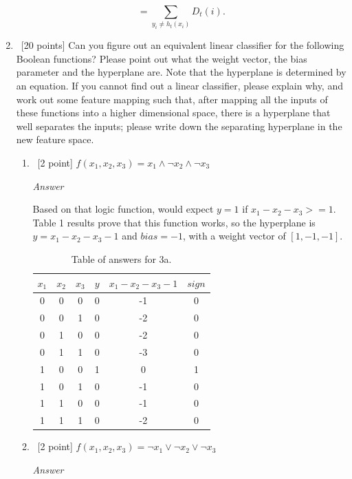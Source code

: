 \documentclass[12pt, fullpage,letterpaper]{article}
\begin{document}
\begin{enumerate}
\[
    = \sum_{y_i \neq h_t(x_i)} D_t(i).
\]

\item~[20 points] Can you figure out an equivalent linear classifier for the following Boolean functions? Please point out what the weight vector, the bias parameter and the hyperplane are. Note that the hyperplane is determined by an equation. If you cannot find out a  linear classifier, please explain why, and work out some feature mapping such that, after mapping all the inputs of these functions into a higher dimensional space, there is a hyperplane that well separates the inputs; please write down the separating hyperplane in the new feature space. 
	\begin{enumerate}
		\item~[2 point] $f(x_1, x_2, x_3) = x_1 \land \neg x_2 \land \neg x_3$
		
		\emph{Answer}
		
		Based on that logic function, would expect $y=1$ if $x_1-x_2-x_3>=1$. Table 1 results prove that this function works, so the hyperplane is $y=x_1-x_2-x_3-1$ and $bias=-1$, with a weight vector of $[1, -1, -1]$.
		
		\begin{table}
        	\centering
        	\begin{tabular}{ccccc|c}
        		$x_1 $ & $x_2$ & $x_3$ & $y$ & $x_1-x_2-x_3-1$ & $sign$\\ 
        		\hline\hline
        		0 & 0 & 0 & 0 & -1 & 0 \\ \hline
        		0 & 0 & 1 & 0 & -2 & 0 \\ \hline
        		0 & 1 & 0 & 0 & -2 & 0 \\ \hline
        		0 & 1 & 1 & 0 & -3 & 0 \\ \hline
        		1 & 0 & 0 & 1 &  0 & 1 \\ \hline
        		1 & 0 & 1 & 0 & -1 & 0 \\ \hline
        		1 & 1 & 0 & 0 & -1 & 0 \\ \hline
        		1 & 1 & 1 & 0 & -2 & 0 \\ \hline
        	\end{tabular}
        	\caption{Table of answers for 3a.}\label{tb:1}
        \end{table}
		
		\item~[2 point] $f(x_1, x_2, x_3) = \neg x_1 \lor \neg x_2 \lor \neg x_3$ 
		
		\emph{Answer}
		

\end{enumerate}
\end{enumerate}
\end{document}
